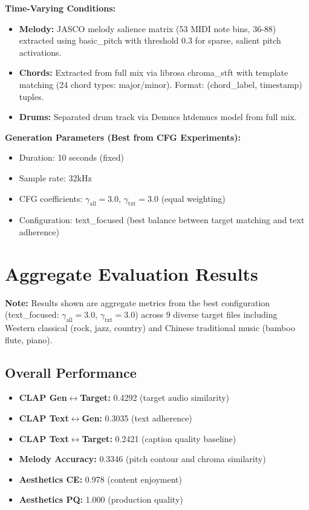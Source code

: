 \documentclass{article}
\begin{document}
\textbf{Time-Varying Conditions:}
\begin{itemize}
    \item \textbf{Melody:} JASCO melody salience matrix (53 MIDI note bins, 36-88) extracted using basic\_pitch with threshold 0.3 for sparse, salient pitch activations.
    \item \textbf{Chords:} Extracted from full mix via librosa chroma\_stft with template matching (24 chord types: major/minor). Format: (chord\_label, timestamp) tuples.
    \item \textbf{Drums:} Separated drum track via Demucs htdemucs model from full mix.
\end{itemize}

\textbf{Generation Parameters (Best from CFG Experiments):}
\begin{itemize}
    \item Duration: 10 seconds (fixed)
    \item Sample rate: 32kHz
    \item CFG coefficients: $\gamma_{\text{all}}=3.0$, $\gamma_{\text{txt}}=3.0$ (equal weighting)
    \item Configuration: text\_focused (best balance between target matching and text adherence)
\end{itemize}

\section{Aggregate Evaluation Results}

\textbf{Note:} Results shown are aggregate metrics from the best configuration (text\_focused: $\gamma_{\text{all}}=3.0$, $\gamma_{\text{txt}}=3.0$) across 9 diverse target files including Western classical (rock, jazz, country) and Chinese traditional music (bamboo flute, piano).

\subsection{Overall Performance}

\begin{itemize}
    \item \textbf{CLAP Gen$\leftrightarrow$Target:} 0.4292 (target audio similarity)
    \item \textbf{CLAP Text$\leftrightarrow$Gen:} 0.3035 (text adherence)
    \item \textbf{CLAP Text$\leftrightarrow$Target:} 0.2421 (caption quality baseline)
    \item \textbf{Melody Accuracy:} 0.3346 (pitch contour and chroma similarity)
    \item \textbf{Aesthetics CE:} 0.978 (content enjoyment)
    \item \textbf{Aesthetics PQ:} 1.000 (production quality)
\end{itemize}
\end{document}
